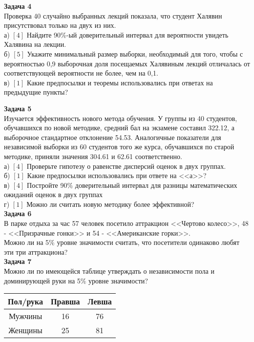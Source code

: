 \documentclass[pdftex,12pt,a4paper]{article}
\begin{document}
\textbf{Задача 4} \\ %
Проверка 40 случайно выбранных лекций показала, что студент
Халявин присутствовал только на двух из них. \\
а) $[4]$ Найдите 90\%-ый доверительный интервал для вероятности
увидеть Халявина на лекции. \\
б) $[5]$ Укажите минимальный размер выборки, необходимый для того,
чтобы с вероятностью 0,9 выборочная доля посещаемых Халявиным
лекций
отличалась от соответствующей вероятности не более, чем на 0,1. \\
в) $[1]$ Какие предпосылки и теоремы использовались при ответах на предыдущие пункты? \\

\newpage

\textbf{Задача 5} \\ %
Изучается эффективность нового метода обучения. У группы из 40
студентов, обучавшихся по новой методике, средний бал на экзамене
составил 322.12, а выборочное стандартное отклонение 54.53.
Аналогичные показатели для независимой выборки из 60 студентов
того же курса, обучавшихся по старой методике,
приняли значения 304.61 и 62.61 соответственно. \\
а) $[4]$ Проверьте гипотезу о равенстве дисперсий оценок в двух
группах.
\\
б) $[1]$ Какие предпосылки использовались при ответе на <<а>>? \\
в) $[4]$ Постройте 90\% доверительный интервал для разницы
математических ожиданий оценок в двух группах \\
г) $[1]$ Можно ли считать новую методику более эффективной? \\

\textbf{Задача 6} \\ %
В парке отдыха за час 57 человек посетило аттракцион <<Чертово
колесо>>, 48 - <<Призрачные гонки>> и 54 - <<Американские горки>>.\\
Можно ли на 5\% уровне значимости считать, что посетители
одинаково любят эти три аттракциона? \\

\textbf{Задача 7} \\ %
Можно ли по имеющейся таблице утверждать о независимости пола и
доминирующей руки на 5\% уровне значимости? \\
\begin{tabular}{|c|c|c|}
  \hline
  Пол/рука & Правша & Левша \\
  \hline
  Мужчины & 16 & 76 \\
  Женщины & 25 & 81 \\
  \hline
\end{tabular} \\ \\
\end{document}
